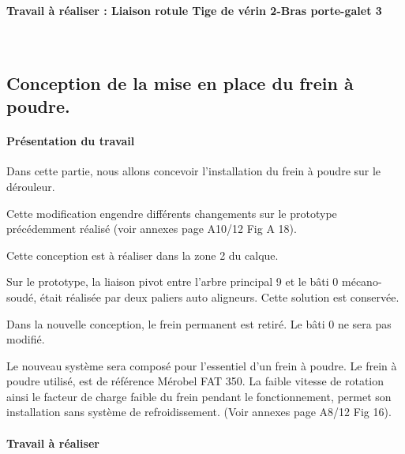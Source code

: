\paragraph{Travail à réaliser : Liaison rotule Tige de vérin 2-Bras porte-galet 3} ~\ \\


\subsection{Conception de la mise en place du frein à poudre.}

\paragraph{Présentation du travail}

Dans cette partie, nous allons concevoir l'installation du frein à poudre sur le dérouleur.

Cette modification engendre différents changements sur le prototype précédemment réalisé
(voir annexes page A10/12 Fig A 18).

Cette conception est à réaliser dans la zone 2 du calque.

Sur le prototype, la liaison pivot entre l'arbre principal 9 et le bâti 0 mécano-soudé, était réalisée
par deux paliers auto aligneurs. Cette solution est conservée.

Dans la nouvelle conception, le frein permanent est retiré. Le bâti 0 ne sera pas modifié.

Le nouveau système sera composé pour l'essentiel d'un frein à poudre. Le frein à poudre
utilisé, est de référence Mérobel FAT 350. La faible vitesse de rotation ainsi le facteur de
charge faible du frein pendant le fonctionnement, permet son installation sans système de
refroidissement. (Voir annexes page A8/12 Fig 16).

\paragraph{Travail à réaliser}


